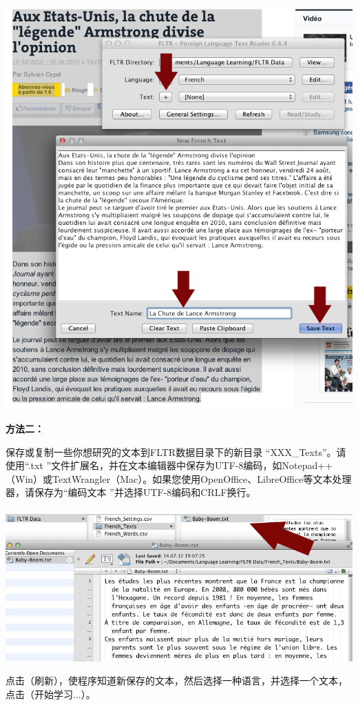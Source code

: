 \documentclass[cn,10pt,math=newtx,citestyle=gb7714-2015,bibstyle=gb7714-2015]{elegantbook}
\begin{document}
\includegraphics[scale=0.5]{image/images-035.png}

\textbf{方法二：}

保存或复制一些你想研究的文本到FLTR数据目录下的新目录 “XXX\_Texts”。请使用“.txt ”文件扩展名，并在文本编辑器中保存为UTF-8编码，如Notepad++（Win）或TextWrangler（Mac）。如果您使用OpenOffice、LibreOffice等文本处理器，请保存为“编码文本 ”并选择UTF-8编码和CRLF换行。

\includegraphics[scale=0.5]{image/images-037.png}

点击（刷新），使程序知道新保存的文本，然后选择一种语言，并选择一个文本，点击（开始学习...）。
\end{document}
